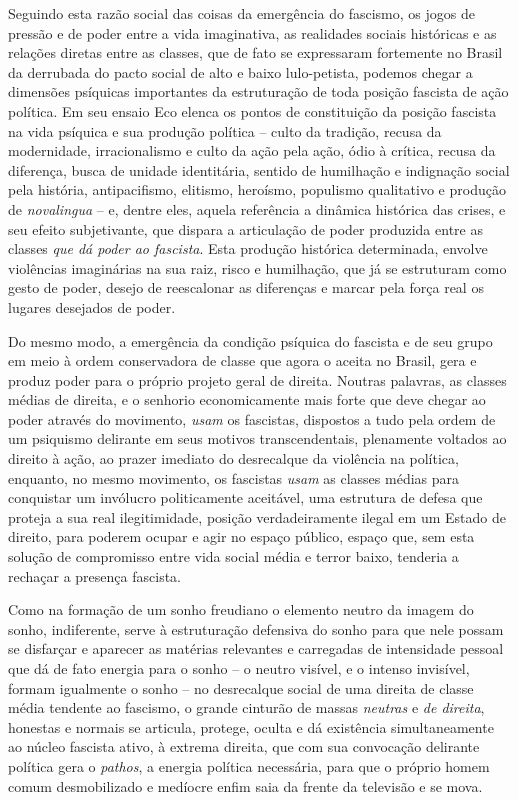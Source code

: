 Seguindo esta razão social das coisas da emergência do fascismo, os
jogos de pressão e de poder entre a vida imaginativa, as realidades
sociais históricas e as relações diretas entre as classes, que de fato
se expressaram fortemente no Brasil da derrubada do pacto social de alto
e baixo lulo-petista, podemos chegar a dimensões psíquicas importantes
da estruturação de toda posição fascista de ação política. Em seu ensaio
Eco elenca os pontos de constituição da posição fascista na vida
psíquica e sua produção política -- culto da tradição, recusa da
modernidade, irracionalismo e culto da ação pela ação, ódio à crítica,
recusa da diferença, busca de unidade identitária, sentido de humilhação
e indignação social pela história, antipacifismo, elitismo, heroísmo,
populismo qualitativo e produção de \emph{novalingua} -- e, dentre eles,
aquela referência a dinâmica histórica das crises, e seu efeito
subjetivante, que dispara a articulação de poder produzida entre as
classes \emph{que dá poder ao fascista}. Esta produção histórica
determinada, envolve violências imaginárias na sua raiz, risco e
humilhação, que já se estruturam como gesto de poder, desejo de
reescalonar as diferenças e marcar pela força real os lugares desejados
de poder.

Do mesmo modo, a emergência da condição psíquica do fascista e de seu
grupo em meio à ordem conservadora de classe que agora o aceita no
Brasil, gera e produz poder para o próprio projeto geral de direita.
Noutras palavras, as classes médias de direita, e o senhorio
economicamente mais forte que deve chegar ao poder através do movimento,
\emph{usam} os fascistas, dispostos a tudo pela ordem de um psiquismo
delirante em seus motivos transcendentais, plenamente voltados ao
direito à ação, ao prazer imediato do desrecalque da violência na
política, enquanto, no mesmo movimento, os fascistas \emph{usam} as
classes médias para conquistar um invólucro politicamente aceitável, uma
estrutura de defesa que proteja a sua real ilegitimidade, posição
verdadeiramente ilegal em um Estado de direito, para poderem ocupar e
agir no espaço público, espaço que, sem esta solução de compromisso
entre vida social média e terror baixo, tenderia a rechaçar a presença
fascista.

Como na formação de um sonho freudiano o elemento neutro da imagem do
sonho, indiferente, serve à estruturação defensiva do sonho para que
nele possam se disfarçar e aparecer as matérias relevantes e carregadas
de intensidade pessoal que dá de fato energia para o sonho -- o neutro
visível, e o intenso invisível, formam igualmente o sonho -- no
desrecalque social de uma direita de classe média tendente ao fascismo,
o grande cinturão de massas \emph{neutras} e \emph{de direita}, honestas
e normais se articula, protege, oculta e dá existência simultaneamente
ao núcleo fascista ativo, à extrema direita, que com sua convocação
delirante política gera o \emph{pathos}, a energia política necessária,
para que o próprio homem comum desmobilizado e medíocre enfim saia da
frente da televisão e se mova.

